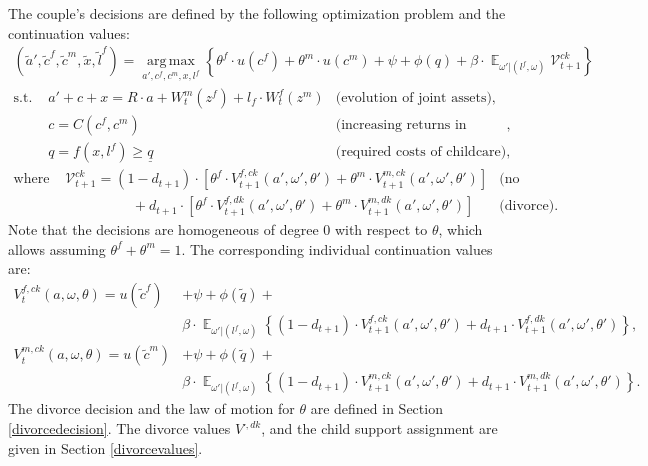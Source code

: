 \documentclass[12pt,letter]{article}
\DeclareMathOperator*{\argmax}{\mathrm{arg\,max}}
\DeclareMathOperator{\E}{\mathbb{E}}
\begin{document}
The couple's decisions are defined by the following optimization problem and the continuation values:
\begin{align}(\tilde a',\tilde c^f,\tilde c^m,\tilde x,\tilde l^f)  = \argmax\limits_{a',c^f,c^m,x,l^f} \left\{\theta^f \cdot u(c^f) + \theta^m\cdot u(c^m) + \psi + \phi(q) + \beta\cdot \E_{\omega'|(l^f,\omega)} \mathcal{V}^{ck}_{t+1}\right\}
 \end{align}
\vspace{-2em}
\begin{align*}
\text{s.t. \ } & a' + c + x = R\cdot a  + W^m_t(z^f) + l_f \cdot W^f_t(z^m) & \text{(evolution of joint assets)},\\
                    & c =C(c^f,c^m) & \text{(increasing returns in consumption)},\\
                    & q = f(x,l^f) \geq \underline{q} & \text{(required costs of childcare)},
\end{align*}
\vspace{-2em}
\begin{align*}
\text{where \ } & \mathcal{V}^{ck}_{t+1} =   (1-d_{t+1})\cdot \left[ \theta^f \cdot V^{f,ck}_{t+1}(a',\omega',\theta') +  \theta^m \cdot V^{m,ck}_{t+1}(a',\omega',\theta')\right]  & \text{(no divorce),} \\
& \hspace{2cm}+ d_{t+1}\cdot \left[ \theta^f \cdot V^{f,dk}_{t+1}(a',\omega',\theta') +  \theta^m \cdot V^{m,dk}_{t+1}(a',\omega',\theta')\right] & \text{(divorce).}
\end{align*}
Note that the decisions are homogeneous of degree $0$ with respect to $\theta$, which allows assuming $\theta^f + \theta^m = 1$. The corresponding individual continuation values are:
\begin{align}
V^{f,ck}_{t}(a,\omega,\theta)  = u(\tilde{c}^f) & + \psi + \phi(\tilde{q}) + \\\nonumber &\beta \cdot \E_{\omega'|(l^f,\omega)} \left\{ (1-d_{t+1}) \cdot V^{f,ck}_{t+1}(a',\omega',\theta')  + d_{t+1} \cdot V^{f,dk}_{t+1}(a',\omega',\theta') \right\},\\
V^{m,ck}_{t}(a,\omega,\theta)  = u(\tilde{c}^m) & + \psi + \phi(\tilde{q}) + \\\nonumber &\beta \cdot \E_{\omega'|(l^f,\omega)} \left\{ (1-d_{t+1}) \cdot  V^{m,ck}_{t+1}(a',\omega',\theta')  + d_{t+1} \cdot V^{m,dk}_{t+1}(a',\omega',\theta') \right\}.
\end{align}
The divorce decision and the law of motion for $\theta$ are defined in Section \ref{divorcedecision}. The divorce values $V^{\cdot,dk}$, and the child support assignment are given in Section \ref{divorcevalues}.
\end{document}
